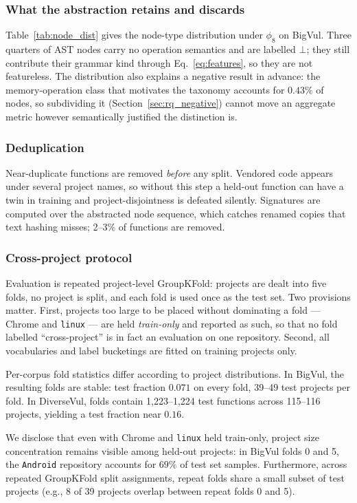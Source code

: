 \subsubsection{What the abstraction retains and discards}
Table~\ref{tab:node_dist} gives the node-type distribution under
$\phi_8$ on BigVul. Three quarters of AST nodes carry no operation semantics
and are labelled $\bot$; they still contribute their grammar kind through
Eq.~\eqref{eq:features}, so they are not featureless. The distribution also
explains a negative result in advance: the memory-operation class that
motivates the taxonomy accounts for $0.43\%$ of nodes, so subdividing it
(Section~\ref{sec:rq_negative}) cannot move an aggregate metric however
semantically justified the distinction is.



\subsubsection{Deduplication}
Near-duplicate functions are removed \emph{before} any split. Vendored code
appears under several project names, so without this step a held-out function
can have a twin in training and project-disjointness is defeated silently.
Signatures are computed over the abstracted node sequence, which catches
renamed copies that text hashing misses; 2--3\% of functions are removed.

\subsubsection{Cross-project protocol}
\label{sec:protocol}
Evaluation is repeated project-level GroupKFold: projects are dealt into five
folds, no project is split, and each fold is used once as the test set. Two
provisions matter. First, projects too large to be placed without dominating a
fold --- Chrome and \texttt{linux} --- are held \emph{train-only} and reported
as such, so that no fold labelled ``cross-project'' is in fact an evaluation
on one repository. Second, all vocabularies and label bucketings are fitted on
training projects only.

Per-corpus fold statistics differ according to project distributions. In BigVul,
the resulting folds are stable: test fraction $0.071$ on every fold, 39--49 test
projects per fold. In DiverseVul, folds contain 1{,}223--1{,}224 test functions across
115--116 projects, yielding a test fraction near $0.16$.

We disclose that even with Chrome and \texttt{linux} held train-only, project size
concentration remains visible among held-out projects: in BigVul folds 0 and 5,
the \texttt{Android} repository accounts for $69\%$ of test set samples. Furthermore,
across repeated GroupKFold split assignments, repeat folds share a small subset of test
projects (e.g., 8 of 39 projects overlap between repeat folds 0 and 5).

